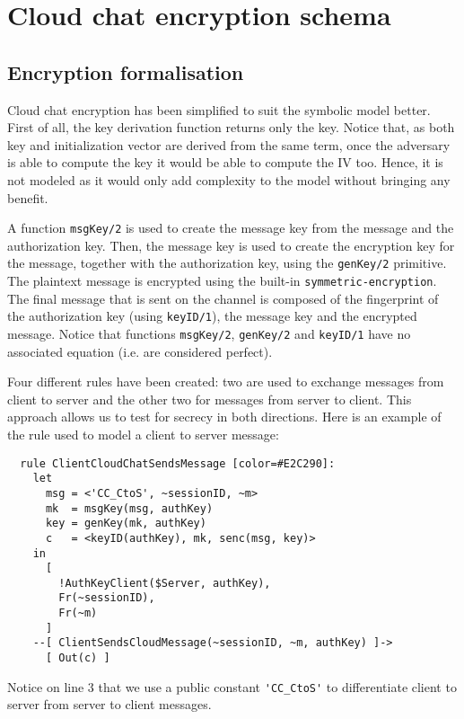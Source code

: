 \section{Cloud chat encryption schema}

\subsection{Encryption formalisation}
Cloud chat encryption has been simplified to suit the symbolic model better.
First of all, the key derivation function returns only the key. Notice that, as both key and initialization vector are derived from the same term, once the adversary is able to compute the key it would be able to compute the IV too. Hence, it is not modeled as it would only add complexity to the model without bringing any benefit.

A function \lstinline{msgKey/2} is used to create the message key from the message and the authorization key. Then, the message key is used to create the encryption key for the message, together with the authorization key, using the \lstinline{genKey/2} primitive. The plaintext message is encrypted using the built-in \lstinline{symmetric-encryption}. The final message that is sent on the channel is composed of the fingerprint of the authorization key (using \lstinline{keyID/1}), the message key and the encrypted message. Notice that functions \lstinline{msgKey/2}, \lstinline{genKey/2} and \lstinline{keyID/1} have no associated equation (i.e. are considered perfect).

Four different rules have been created: two are used to exchange messages from client to server and the other two for messages from server to client. This approach allows us to test for secrecy in both directions. Here is an example of the rule used to model a client to server message:

\begin{lstlisting}
  rule ClientCloudChatSendsMessage [color=#E2C290]:
    let
      msg = <'CC_CtoS', ~sessionID, ~m>
      mk  = msgKey(msg, authKey)
      key = genKey(mk, authKey)
      c   = <keyID(authKey), mk, senc(msg, key)>
    in
      [
        !AuthKeyClient($Server, authKey),
        Fr(~sessionID),
        Fr(~m)
      ]
    --[ ClientSendsCloudMessage(~sessionID, ~m, authKey) ]->
      [ Out(c) ]
\end{lstlisting}

Notice on line 3 that we use a public constant \lstinline{'CC_CtoS'} to differentiate client to server from server to client messages.


